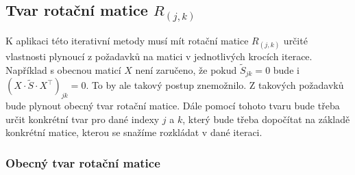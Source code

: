 \documentclass[czech]{article}
\renewcommand\tilde\widetilde
\begin{document}
\subsection{Tvar rotační matice \texorpdfstring{$R_{(j,k)}$}{Rjk}}%
\label{sub:tvar_rotacni_matice_Rjk}

K aplikaci této iterativní metody musí mít rotační matice $R_{(j,k)}$ určité vlastnosti plynoucí z požadavků na matici v jednotlivých krocích iterace. Například s obecnou maticí $X$ není zaručeno, že pokud $\tilde{S}_{jk} = 0$ bude i $\left(X \cdot \tilde{S} \cdot X^{\top} \right)_{jk} = 0$. To by ale takový postup znemožnilo. Z takových požadavků bude plynout obecný tvar rotační matice. Dále pomocí tohoto tvaru bude třeba určit konkrétní tvar pro dané indexy $j$ a $k$, který bude třeba dopočítat na základě konkrétní matice, kterou se snažíme rozkládat v dané iteraci.

\subsubsection{Obecný tvar rotační matice}%
\label{ssub:obecny_tvar_rotacni_matice}
\end{document}
